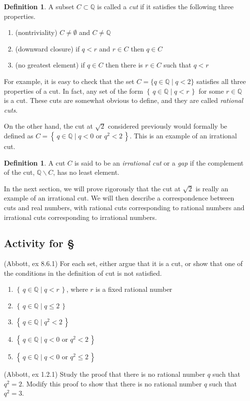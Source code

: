 \documentclass[11pt,oneside]{amsbook}
\newcommand{\set}[1]{\left\{\,#1\,\right\}}
\newcommand{\Q}{\mathbb Q}
\renewcommand{\setminus}{\smallsetminus}
\theoremstyle{definition}
\theoremstyle{plain}
\theoremstyle{definition}
\newtheorem{definition}[theorem]{Definition}
\theoremstyle{remark}
\numberwithin{equation}{section}
\numberwithin{figure}{section}
\newcounter{activityitem}
\newenvironment{activity}{\begin{list}{\arabic{activityitem}.}{\usecounter{activityitem}\setlength{\itemsep}{.2in}}}{\end{list}}
\begin{document}
\begin{definition}
  A subset $C\subset\Q$ is called a \emph{cut} if it satisfies the following three properties.
  \begin{enumerate}
  \item (nontriviality) $C\neq\emptyset$ and $C\neq\Q$
  \item (downward closure) if $q<r$ and $r\in C$ then $q\in C$
  \item (no greatest element) if $q\in C$ then there is $r\in C$ such that $q<r$
  \end{enumerate}
\end{definition}

For example, it is easy to check that the set $C=\{q\in\Q\mid q<2\}$ satisfies all three properties of a cut. In fact, any set of the form $\set{q\in\Q\mid q<r}$ for some $r\in\Q$ is a cut. These cuts are somewhat obvious to define, and they are called \emph{rational cuts}.

On the other hand, the cut at $\sqrt{2}$ considered previously would formally be defined as $C=\set{q\in\Q\mid q<0\text{ or }q^2<2}$. This is an example of an irrational cut.

\begin{definition}
  A cut $C$ is said to be an \emph{irrational cut} or a \emph{gap} if the complement of the cut, $\Q\setminus C$, has no least element.
\end{definition}

In the next section, we will prove rigorously that the cut at $\sqrt{2}$ is really an example of an irrational cut. We will then describe a correspondence between cuts and real numbers, with rational cuts corresponding to rational numbers and irrational cuts corresponding to irrational numbers.

\newpage
\subsection*{Activity for \S \thesection}

\begin{activity}
  \item (Abbott, ex 8.6.1) For each set, either argue that it is a cut, or show that one of the conditions in the definition of cut is not satisfied.
  \begin{enumerate}\itemsep.5in
    \item $\set{q\in\Q\mid q<r}$, where $r$ is a fixed rational number
    \item $\set{q\in\Q\mid q\leq2}$
    \item $\set{q\in\Q\mid q^2<2}$
    \item $\set{q\in\Q\mid q<0\text{ or }q^2<2}$
    \item $\set{q\in\Q\mid q<0\text{ or }q^2\leq2}$
    \vspace{.5in}
  \end{enumerate}
  \item (Abbott, ex 1.2.1) Study the proof that there is no rational number $q$ such that $q^2=2$. Modify this proof to show that there is no rational number $q$ such that $q^2=3$.
  \vspace{\fill}
\end{activity}
\end{document}
